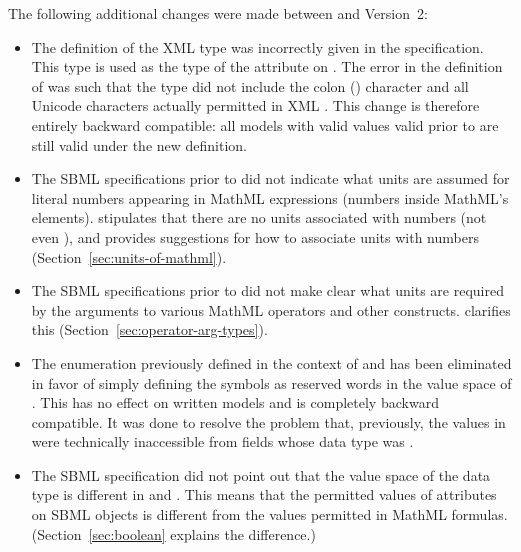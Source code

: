 \begin{blockChanged}
\begin{itemize}
\end{itemize}

The following additional changes were made between \sbmltwotwo and
Version~2:
\begin{itemize}

\item The definition of the XML type  was incorrectly
  given in the \sbmltwotwo specification.  This type is used as
  the type of the attribute  on \SBase.  The error
  in the definition of  was such that the type did
  not include the colon (\token{:}) character and all Unicode
  characters actually permitted in XML .  This change
  is therefore entirely backward compatible: all models with valid
   values valid prior to \sbmltwothree are still
  valid under the new definition.

\item The SBML specifications prior to \sbmltwothree did not
  indicate what units are assumed for literal numbers appearing in
  MathML expressions (\ie numbers inside MathML's 
  elements).  \sbmltwothree stipulates that there are no units
  associated with numbers (not even ), and
  provides suggestions for how to associate units with numbers
  (Section~\ref{sec:units-of-mathml}).

\item The SBML specifications prior to \sbmltwothree did not make
  clear what units are required by the arguments to various MathML
  operators and other constructs.  \sbmltwothree clarifies this
  (Section~\ref{sec:operator-arg-types}).

\item The  enumeration previously defined in
  the context of \Unit and \UnitDefinition has been eliminated in
  favor of simply defining the symbols as reserved words in the
  value space of .  This has no effect on
  written models and is completely backward compatible.  It was
  done to resolve the problem that, previously, the values in
   were technically inaccessible from fields
  whose data type was .

\item The SBML specification did not point out that the value
  space of the data type  is different in
  \mathmltwo and \xmlschemaone.  This means that the permitted
  values of attributes on SBML objects is different from the
  values permitted in MathML formulas.  (Section~\ref{sec:boolean}
  explains the difference.)


\end{itemize}
\end{blockChanged}
